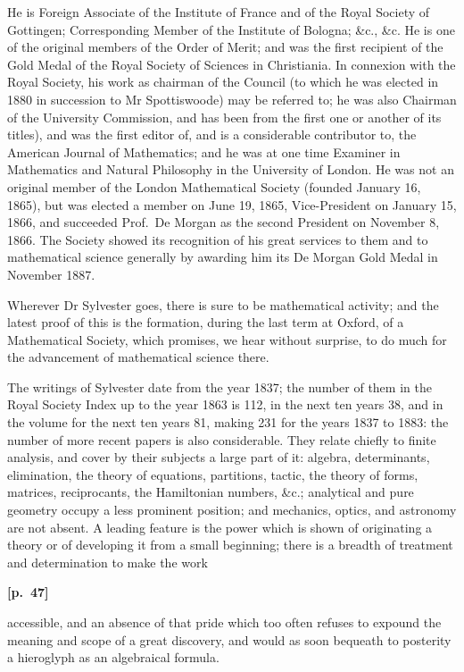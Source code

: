 \documentclass[11pt,a4paper]{book}
\begin{document}
He is Foreign Associate of the Institute of France and of the Royal Society of Gottingen; Corresponding Member of the Institute of Bologna; \&c., \&c. He is one of the original members of the Order of Merit; and was the first recipient of the Gold Medal of the Royal Society of Sciences in Christiania. In connexion with the Royal Society, his work as chairman of the Council (to which he was elected in 1880 in succession to Mr Spottiswoode) may be referred to; he was also Chairman of the University Commission, and has been from the first one or another of its titles), and was the first editor of, and is a considerable contributor to, the American Journal of Mathematics; and he was at one time Examiner in Mathematics and Natural Philosophy in the University of London. He was not an original member of the London Mathematical Society (founded January 16, 1865), but was elected a member on June 19, 1865, Vice-President on January 15, 1866, and succeeded Prof.\ De Morgan as the second President on November 8, 1866. The Society showed its recognition of his great services to them and to mathematical science generally by awarding him its De Morgan Gold Medal in November 1887.

Wherever Dr Sylvester goes, there is sure to be mathematical activity; and the latest proof of this is the formation, during the last term at Oxford, of a Mathematical Society, which promises, we hear without surprise, to do much for the advancement of mathematical science there.

The writings of Sylvester date from the year 1837; the number of them in the Royal Society Index up to the year 1863 is 112, in the next ten years 38, and in the volume for the next ten years 81, making 231 for the years 1837 to 1883: the number of more recent papers is also considerable. They relate chiefly to finite analysis, and cover by their subjects a large part of it: algebra, determinants, elimination, the theory of equations, partitions, tactic, the theory of forms, matrices, reciprocants, the Hamiltonian numbers, \&c.; analytical and pure geometry occupy a less prominent position; and mechanics, optics, and astronomy are not absent. A leading feature is the power which is shown of originating a theory or of developing it from a small beginning; there is a breadth of treatment and determination to make the work

\vspace{0.5em}
\noindent\textbf{[p.\ 47]}

accessible, and an absence of that pride which too often refuses to expound the meaning and scope of a great discovery, and would as soon bequeath to posterity a hieroglyph as an algebraical formula.
\end{document}
